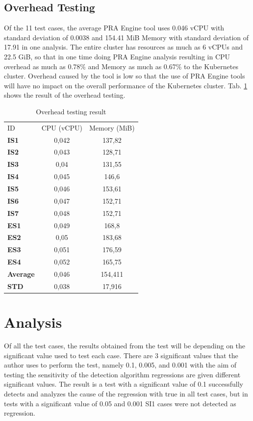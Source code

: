 \documentclass[conference]{configs/IEEEtran}
\begin{document}
\subsection{Overhead Testing}
Of the 11 test cases, the average PRA Engine tool uses 0.046
vCPU with standard deviation of 0.0038 and 154.41 MiB Memory with standard
deviation of 17.91 in one analysis. The entire cluster has resources
as much as 6 vCPUs and 22.5 GiB, so that in one time doing PRA Engine analysis
resulting in CPU overhead as much as 0.78\% and Memory as much as 0.67\% to the Kubernetes cluster. Overhead caused by the tool is low so that the use of PRA Engine tools will have no impact on the overall performance of the Kubernetes cluster. Tab. \ref{overhead-tbl} shows the result of the overhead testing.
\begin{table}[!htb]
	\caption{Overhead testing result}
	\label{overhead-tbl}
	\centering
	\begin{tabular}{|l|c|c|}
		\hline
		ID & CPU (vCPU) & Memory (MiB) \\
		\textbf{IS1}     & 0,042 & 137,82  \\ \hline
		\textbf{IS2}     & 0,043 & 128,71  \\ \hline
		\textbf{IS3}     & 0,04  & 131,55  \\ \hline
		\textbf{IS4}     & 0,045 & 146,6   \\ \hline
		\textbf{IS5}     & 0,046 & 153,61  \\ \hline
		\textbf{IS6}     & 0,047 & 152,71  \\ \hline
		\textbf{IS7}     & 0,048 & 152,71  \\ \hline
		\textbf{ES1}     & 0,049 & 168,8   \\ \hline
		\textbf{ES2}     & 0,05  & 183,68  \\ \hline
		\textbf{ES3}     & 0,051 & 176,59  \\ \hline
		\textbf{ES4}     & 0,052 & 165,75  \\ \hline
		\textbf{Average} & 0,046 & 154,411 \\ \hline
		\textbf{STD}     & 0,038 & 17,916  \\ \hline
	\end{tabular}
\end{table}

\section{Analysis}
Of all the test cases, the results obtained from the test will be
depending on the significant value used to test each case.
There are 3 significant values that the author uses to perform the test, namely 0.1, 0.005, and 0.001 with the aim of testing the sensitivity of the detection algorithm regressions are given different significant values. The result is a test with
a significant value of 0.1 successfully detects and analyzes the cause of the regression with true in all test cases, but in tests with a significant value of 0.05 and 0.001 SI1 cases were not detected as regression.
\end{document}

